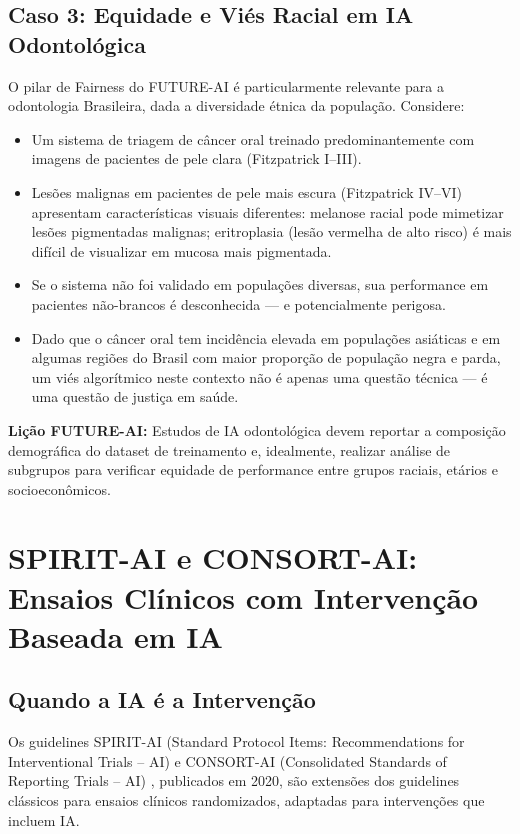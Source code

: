 \subsection{Caso 3: Equidade e Viés Racial em IA Odontológica}

O pilar de Fairness do FUTURE-AI é particularmente relevante para a odontologia Brasileira, dada a diversidade étnica da população. Considere:

\begin{itemize}
    \item Um sistema de triagem de câncer oral treinado predominantemente com imagens de pacientes de pele clara (Fitzpatrick I--III).
    \item Lesões malignas em pacientes de pele mais escura (Fitzpatrick IV--VI) apresentam características visuais diferentes: melanose racial pode mimetizar lesões pigmentadas malignas; eritroplasia (lesão vermelha de alto risco) é mais difícil de visualizar em mucosa mais pigmentada.
    \item Se o sistema não foi validado em populações diversas, sua performance em pacientes não-brancos é desconhecida — e potencialmente perigosa.
    \item Dado que o câncer oral tem incidência elevada em populações asiáticas e em algumas regiões do Brasil com maior proporção de população negra e parda, um viés algorítmico neste contexto não é apenas uma questão técnica — é uma questão de justiça em saúde.
\end{itemize}

\textbf{Lição FUTURE-AI:} Estudos de IA odontológica devem reportar a composição demográfica do dataset de treinamento e, idealmente, realizar análise de subgrupos para verificar equidade de performance entre grupos raciais, etários e socioeconômicos.

\section{SPIRIT-AI e CONSORT-AI: Ensaios Clínicos com Intervenção Baseada em IA}

\subsection{Quando a IA é a Intervenção}

Os guidelines SPIRIT-AI (Standard Protocol Items: Recommendations for Interventional Trials -- AI) e CONSORT-AI (Consolidated Standards of Reporting Trials -- AI) , publicados em 2020, são extensões dos guidelines clássicos para ensaios clínicos randomizados, adaptadas para intervenções que incluem IA.

